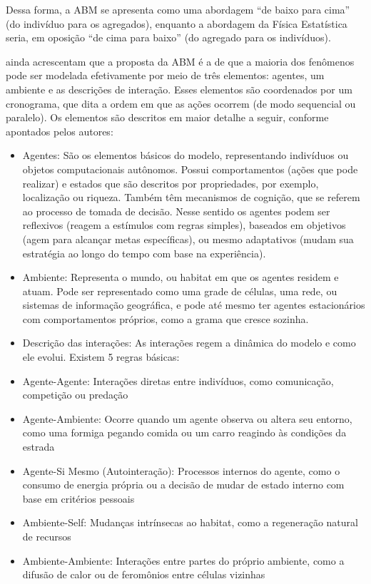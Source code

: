 \documentclass[12pt,oneside,a4paper,brazil,sumario=tradicional]{abntex2}
\begin{document}
Dessa forma, a ABM se apresenta como uma abordagem “de baixo para cima” (do indivíduo para os agregados), enquanto a abordagem da Física Estatística seria, em oposição “de cima para baixo” (do agregado para os indivíduos).

\textcite{wilensky2015} ainda acrescentam que a proposta da ABM é a de que a maioria dos fenômenos pode ser modelada efetivamente por meio de três elementos: agentes, um ambiente e as descrições de interação. Esses elementos são coordenados por um cronograma, que dita a ordem em que as ações ocorrem (de modo sequencial ou paralelo). Os elementos são descritos em maior detalhe a seguir, conforme apontados pelos autores:

\begin{itemize}
  \item Agentes: São os elementos básicos do modelo, representando indivíduos ou objetos computacionais autônomos. Possui comportamentos (ações que pode realizar) e estados que são descritos por propriedades, por exemplo, localização ou riqueza. Também têm mecanismos de cognição, que se referem ao processo de tomada de decisão. Nesse sentido os agentes podem ser reflexivos (reagem a estímulos com regras simples), baseados em objetivos (agem para alcançar metas específicas), ou mesmo adaptativos (mudam sua estratégia ao longo do tempo com base na experiência).
  \item Ambiente: Representa o mundo, ou habitat em que os agentes residem e atuam. Pode ser representado como uma grade de células, uma rede, ou sistemas de informação geográfica, e pode até mesmo ter agentes estacionários com comportamentos próprios, como a grama que cresce sozinha.
  \item Descrição das interações: As interações regem a dinâmica do modelo e como ele evolui. Existem 5 regras básicas:
  \item Agente-Agente: Interações diretas entre indivíduos, como comunicação, competição ou predação
  \item Agente-Ambiente: Ocorre quando um agente observa ou altera seu entorno, como uma formiga pegando comida ou um carro reagindo às condições da estrada
  \item Agente-Si Mesmo (Autointeração): Processos internos do agente, como o consumo de energia própria ou a decisão de mudar de estado interno com base em critérios pessoais
  \item Ambiente-Self: Mudanças intrínsecas ao habitat, como a regeneração natural de recursos
  \item Ambiente-Ambiente: Interações entre partes do próprio ambiente, como a difusão de calor ou de feromônios entre células vizinhas
\end{itemize}
\end{document}
